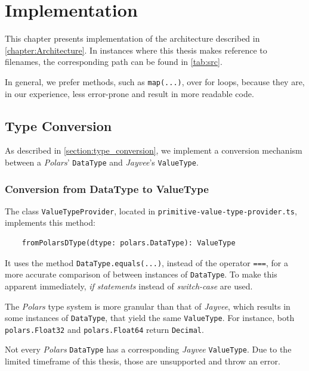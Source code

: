 \chapter{Implementation}
\label{chapter:Implementation}

This chapter presents implementation of the architecture described in \autoref{chapter:Architecture}.
In instances where this thesis makes reference to filenames, the corresponding path can be found in \autoref{tab:src}.

In general, we prefer methods, such as \Verb|map(...)|, over for loops, because they are, in our experience, less error-prone and result in more readable code.

\section{Type Conversion}
\label{subsection:TypeConversion}
As described in \autoref{section:type_conversion}, we implement a conversion mechanism between a \emph{Polars}' \Verb|DataType| and \emph{Jayvee}'s \Verb|ValueType|.

\subsection{Conversion from DataType to ValueType}
\label{impl:types:dtov}
The class \Verb|ValueTypeProvider|, located in \Verb|primitive-value-type-provider.ts|, implements this method:
\begin{center}
	\begin{verbatim}
	fromPolarsDType(dtype: polars.DataType): ValueType
	\end{verbatim}
\end{center}

It uses the method \Verb|DataType.equals(...)|, instead of the operator \Verb|===|, for a more accurate comparison of between instances of \Verb|DataType|.
To make this apparent immediately, \emph{if statements} instead of \emph{switch-case} are used.

The \emph{Polars} type system is more granular than that of \emph{Jayvee}, which results in some instances of \Verb|DataType|, that yield the same \Verb|ValueType|.
For instance, both \Verb|polars.Float32| and \Verb|polars.Float64| return \Verb|Decimal|.

Not every \emph{Polars} \Verb|DataType| has a corresponding \emph{Jayvee} \Verb|ValueType|.
Due to the limited timeframe of this thesis, those are unsupported and throw an error.

